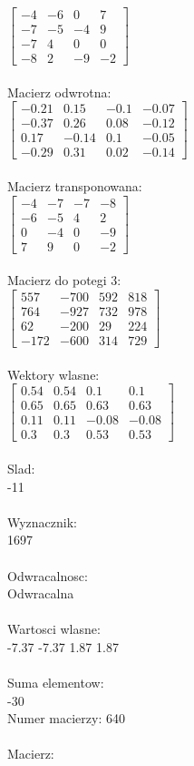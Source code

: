 \documentclass[a4paper,12pt]{article}
\begin{document}
$\begin{bmatrix} -4&-6&0&7\\-7&-5&-4&9\\-7&4&0&0\\-8&2&-9&-2 \end{bmatrix}$
\\
\\
Macierz odwrotna:\\

$\begin{bmatrix} -0.21&0.15&-0.1&-0.07\\-0.37&0.26&0.08&-0.12\\0.17&-0.14&0.1&-0.05\\-0.29&0.31&0.02&-0.14 \end{bmatrix}$
\\
\\
Macierz transponowana:\\

$\begin{bmatrix} -4&-7&-7&-8\\-6&-5&4&2\\0&-4&0&-9\\7&9&0&-2 \end{bmatrix}$
\\
\\
Macierz do potegi 3:\\

$\begin{bmatrix} 557&-700&592&818\\764&-927&732&978\\62&-200&29&224\\-172&-600&314&729 \end{bmatrix}$
\\
\\
Wektory wlasne:\\

$\begin{bmatrix} 0.54&0.54&0.1&0.1\\0.65&0.65&0.63&0.63\\0.11&0.11&-0.08&-0.08\\0.3&0.3&0.53&0.53 \end{bmatrix}$
\\
\\
Slad:\\
-11
\\
\\
Wyznacznik:\\
1697
\\
\\
Odwracalnosc:\\
Odwracalna
\\
\\
Wartosci wlasne:\\
-7.37 -7.37 1.87 1.87
\\
\\
Suma elementow:\\
-30
\\
\newpage
Numer macierzy:
640
\\
\\
Macierz:\\
\end{document}
